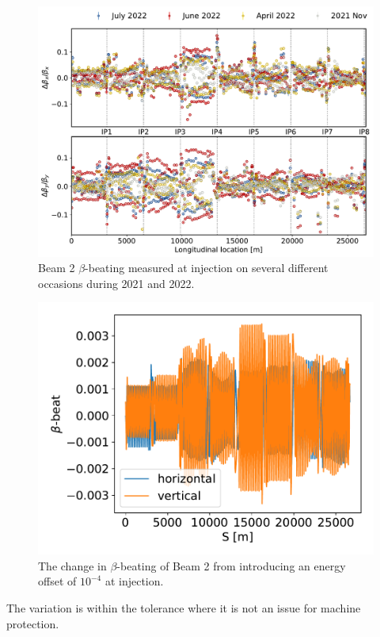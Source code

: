 \documentclass[a4paper]{cernatsnote}
\begin{document}
\begin{figure}
  \centering
\includegraphics[width=0.8\linewidth]{plots/beam2/comp_injection_several.pdf}
\caption{Beam 2 $\beta$-beating measured at injection on several different occasions during 2021 and 2022. }
\label{fig:comp_several_beam2}
\end{figure}

\begin{figure}
  \centering
\includegraphics[width=0.8\linewidth]{plots/beam2/injection_energy.pdf}
\caption{The change in $\beta$-beating of Beam 2 from introducing an energy offset of $10^{-4}$ at injection. }
\label{fig:energy_offset_injection}
\end{figure}

The variation is within the tolerance where it is not an issue for machine protection. 
\end{document}
